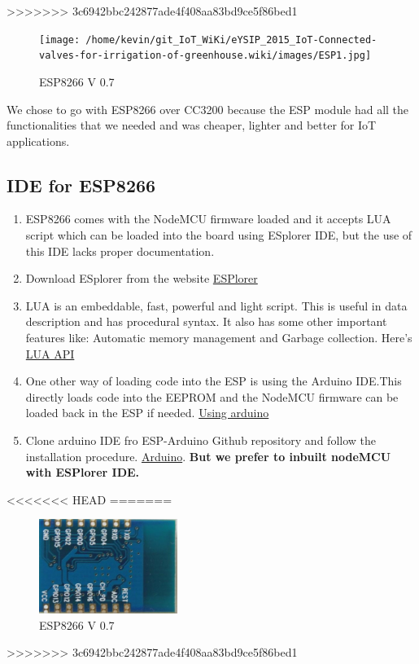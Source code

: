 \documentclass[16pt]{article}
\begin{document}
\vspace{0.4cm}
>>>>>>> 3c6942bbc242877ade4f408aa83bd9ce5f86bed1

  \begin{figure}
\hspace{3cm}
\texttt{[image: /home/kevin/git\_IoT\_WiKi/eYSIP\_2015\_IoT-Connected-valves-for-irrigation-of-greenhouse.wiki/images/ESP1.jpg]}
\caption{ESP8266 V 0.7}
\end{figure}
\vspace{0.4cm}

We chose to go with ESP8266 over CC3200 because the ESP module had all
the functionalities that we needed and was cheaper, lighter and better
for IoT applications.




\subsection{IDE for ESP8266}

\begin{enumerate}

\item
  ESP8266 comes with the NodeMCU firmware loaded and it accepts LUA
  script which can be loaded into the board using ESplorer IDE, but the
  use of this IDE lacks proper documentation.
\item
  Download ESplorer from the website \href{http://esp8266.ru/esplorer/#download}{ESPlorer}
\item
  LUA is an embeddable, fast, powerful and light script. This is useful in data
  description and has procedural syntax. It also has some other
  important features like: Automatic memory management and Garbage
  collection. Here's \href{http://www.lua.org/manual/5.3/}{LUA API}
\item
  One other way of loading code into the ESP is using the Arduino
  IDE.This directly loads code into the EEPROM and the NodeMCU firmware
  can be loaded back in the ESP if
  needed. \href{https://learn.adafruit.com/adafruit-huzzah-esp8266-breakout/using-arduino-ide}{Using arduino}
\item Clone
  arduino IDE fro ESP-Arduino Github repository and follow
  the installation procedure. \href{https://github.com/esp8266/Arduino.git}{Arduino}. \textbf{But we prefer to inbuilt nodeMCU with ESPlorer IDE.}
\end{enumerate}


<<<<<<< HEAD
=======
 \begin{figure}
\hspace{3cm}
\includegraphics[width=0.4\textwidth]{images/ESP1.jpg}
\caption{ESP8266 V 0.7}
\end{figure}
>>>>>>> 3c6942bbc242877ade4f408aa83bd9ce5f86bed1
\end{document}

